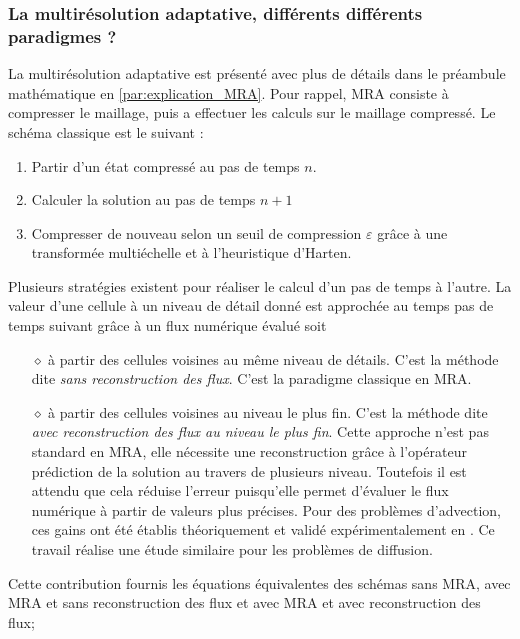         \subsubsection{La multirésolution adaptative, différents différents paradigmes ?}\label{par:paradigme_MRA}
            La multirésolution adaptative est présenté avec plus de détails dans le préambule mathématique en \ref{par:explication_MRA}.    
            Pour rappel, MRA consiste à compresser le maillage, puis a effectuer les calculs sur le maillage compressé.
            Le schéma classique est le suivant : 
            \begin{enumerate}
                \item Partir d'un état compressé au pas de temps $n$.
                \item Calculer la solution au pas de temps $n+1$
                \item Compresser de nouveau selon un seuil de compression $\varepsilon$ grâce à une transformée multiéchelle et à l'heuristique d'Harten.
            \end{enumerate}
            Plusieurs stratégies existent pour réaliser le calcul d'un pas de temps à l'autre. La valeur d'une cellule à un niveau de détail donné est approchée au temps pas de temps suivant
            grâce à un flux numérique évalué soit
            \begin{itemize}
                \item[$\diamond$] à partir des cellules voisines au même niveau de détails. C'est la méthode dite \textit{sans reconstruction des flux}. C'est la paradigme classique en MRA.
                \item[$\diamond$] à partir des cellules voisines au niveau le plus fin. C'est la méthode dite \textit{avec reconstruction des flux au niveau le plus fin}.
                Cette approche n'est pas standard en MRA, elle nécessite une reconstruction grâce à l'opérateur prédiction de la solution au travers de plusieurs niveau. 
                Toutefois il est attendu que cela réduise l'erreur puisqu'elle permet d'évaluer le flux numérique à partir de valeurs plus précises.
                Pour des problèmes d'advection, ces gains ont été établis théoriquement et validé expérimentalement en \cite{belloti_et_al_2025}.
                Ce travail réalise une étude similaire pour les problèmes de diffusion.
            \end{itemize}
            Cette contribution fournis les équations équivalentes des schémas sans MRA, avec MRA et sans reconstruction des flux et avec MRA et avec reconstruction des flux;
